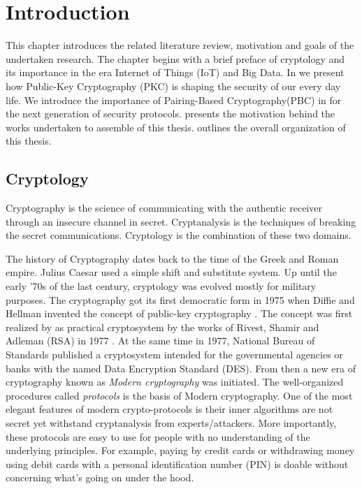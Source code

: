 \chapter{Introduction}
\label{chapter1}



This chapter introduces the related literature review, motivation and goals of the undertaken research.
The chapter begins with a brief preface of cryptology and its importance in the era Internet of Things (IoT) and Big Data.
In  we present how Public-Key Cryptography (PKC) is shaping the security of our every day life.
We introduce the importance of Pairing-Based Cryptography(PBC) in  for the next generation of security protocols. 
 presents the motivation behind the works undertaken to assemble of this thesis.
 outlines the overall organization of this thesis.

\section{Cryptology}
\label{ch1_sec_crypto}
Cryptography is the science of communicating with the authentic receiver through an insecure channel in secret. 
Cryptanalysis is the techniques of breaking the secret communications.
Cryptology is the combination of these two domains.

The history of Cryptography dates back to the time of the Greek and Roman empire.
Julius Caesar used a simple shift and substitute system.
Up until the early '70s of the last century, cryptology was evolved mostly for military purposes. 
The cryptography got its first democratic form in 1975 when Diffie and Hellman invented the concept of public-key cryptography \cite{diffie1976new}. 
The concept was first realized by as practical cryptosystem by the works of Rivest, Shamir and Adleman (RSA) in 1977 \cite{rivest1978method}.
At the same time in 1977, National Bureau of Standards published a cryptosystem intended for the governmental agencies or banks with the named Data Encryption Standard (DES).
From then a new era of cryptography known as \textit{Modern cryptography} was initiated.
The well-organized procedures called \textit{protocols} is the basis of Modern cryptography.
One of the most elegant features of modern crypto-protocols is their inner algorithms are not secret yet withstand cryptanalysis from experts/attackers.
More importantly, these protocols are easy to use for people with no understanding of the underlying principles.
For example, paying by credit cards or withdrawing money using debit cards with a personal identification number (PIN) is doable without concerning what’s going on under the hood. 

